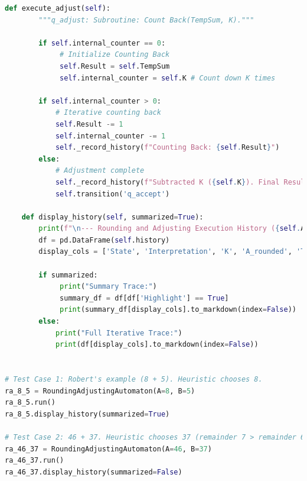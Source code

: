 \documentclass[11pt]{article}
\begin{document}
\begin{lstlisting}[language=Python]
    def execute_adjust(self):
        """q_adjust: Subroutine: Count Back(TempSum, K)."""

        if self.internal_counter == 0:
             # Initialize Counting Back
             self.Result = self.TempSum
             self.internal_counter = self.K # Count down K times

        if self.internal_counter > 0:
            # Iterative counting back
            self.Result -= 1
            self.internal_counter -= 1
            self._record_history(f"Counting Back: {self.Result}")
        else:
            # Adjustment complete
            self._record_history(f"Subtracted K ({self.K}). Final Result: {self.Result}.", highlight=True)
            self.transition('q_accept')

    def display_history(self, summarized=True):
        print(f"\n--- Rounding and Adjusting Execution History ({self.A_initial} + {self.B_initial}) ---")
        df = pd.DataFrame(self.history)
        display_cols = ['State', 'Interpretation', 'K', 'A_rounded', 'TempSum', 'Result']

        if summarized:
             print("Summary Trace:")
             summary_df = df[df['Highlight'] == True]
             print(summary_df[display_cols].to_markdown(index=False))
        else:
            print("Full Iterative Trace:")
            print(df[display_cols].to_markdown(index=False))


# Test Case 1: Robert's example (8 + 5). Heuristic chooses 8.
ra_8_5 = RoundingAdjustingAutomaton(A=8, B=5)
ra_8_5.run()
ra_8_5.display_history(summarized=True)

# Test Case 2: 46 + 37. Heuristic chooses 37 (remainder 7 > remainder 6).
ra_46_37 = RoundingAdjustingAutomaton(A=46, B=37)
ra_46_37.run()
ra_46_37.display_history(summarized=False)
\end{lstlisting}
\end{document}
